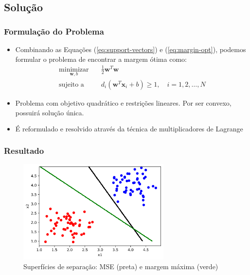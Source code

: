 \documentclass{beamer}
\begin{document}

\subsection{Solução}

\begin{frame}
	\frametitle{Formulação do Problema}
	\begin{itemize}
		\item Combinando as Equações (\ref{eq:support-vectors}) e (\ref{eq:margin-opt}), podemos formular o problema de encontrar a margem ótima como:
		\begin{align}
			\underset{\textbf{w},b}{\text{minimizar}} \quad & \frac{1}{2}\textbf{w}^T\textbf{w} \\ 
			\text{sujeito a} \quad & d_i(\textbf{w}^T\textbf{x}_i + b) \geq 1, \quad i=1,2,\dots,N  \nonumber
			\label{eq:opt-prob1}
		\end{align} 
		\item Problema com objetivo quadrático e restrições lineares. Por ser convexo, possuirá solução única.
		\item É reformulado e resolvido através da técnica de multiplicadores de Lagrange \cite{haykin}
		
	\end{itemize}
	
\end{frame}

\begin{frame}
	\frametitle{Resultado}
	\begin{figure}[h!]
		\centering
		\includegraphics[width=3in]{fig02.png}
		\caption{Superfícies de separação: MSE (preta) e margem máxima (verde)}
		\label{fig:opt-margin-ds}
	\end{figure}
\end{frame}
\end{document}
